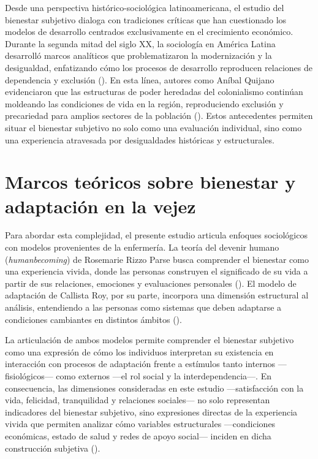 \documentclass[
  spanish,
  a4paper,
  oneside]{scrbook}
\begin{document}
Desde una perspectiva histórico-sociológica latinoamericana, el estudio
del bienestar subjetivo dialoga con tradiciones críticas que han
cuestionado los modelos de desarrollo centrados exclusivamente en el
crecimiento económico. Durante la segunda mitad del siglo XX, la
sociología en América Latina desarrolló marcos analíticos que
problematizaron la modernización y la desigualdad, enfatizando cómo los
procesos de desarrollo reproducen relaciones de dependencia y exclusión
(). En esta línea,
autores como Aníbal Quijano evidenciaron que las estructuras de poder
heredadas del colonialismo continúan moldeando las condiciones de vida
en la región, reproduciendo exclusión y precariedad para amplios
sectores de la población ().
Estos antecedentes permiten situar el bienestar subjetivo no solo como
una evaluación individual, sino como una experiencia atravesada por
desigualdades históricas y estructurales.

\section{Marcos teóricos sobre bienestar y adaptación en la
vejez}\label{marcos-teuxf3ricos-sobre-bienestar-y-adaptaciuxf3n-en-la-vejez}

Para abordar esta complejidad, el presente estudio articula enfoques
sociológicos con modelos provenientes de la enfermería. La teoría del
devenir humano (\emph{humanbecoming}) de Rosemarie Rizzo Parse busca
comprender el bienestar como una experiencia vivida, donde las personas
construyen el significado de su vida a partir de sus relaciones,
emociones y evaluaciones personales
(). El modelo de
adaptación de Callista Roy, por su parte, incorpora una dimensión
estructural al análisis, entendiendo a las personas como sistemas que
deben adaptarse a condiciones cambiantes en distintos ámbitos
().

La articulación de ambos modelos permite comprender el bienestar
subjetivo como una expresión de cómo los individuos interpretan su
existencia en interacción con procesos de adaptación frente a estímulos
tanto internos ---fisiológicos--- como externos ---el rol social y la
interdependencia---. En consecuencia, las dimensiones consideradas en
este estudio ---satisfacción con la vida, felicidad, tranquilidad y
relaciones sociales--- no solo representan indicadores del bienestar
subjetivo, sino expresiones directas de la experiencia vivida que
permiten analizar cómo variables estructurales ---condiciones
económicas, estado de salud y redes de apoyo social--- inciden en dicha
construcción subjetiva ().
\end{document}
